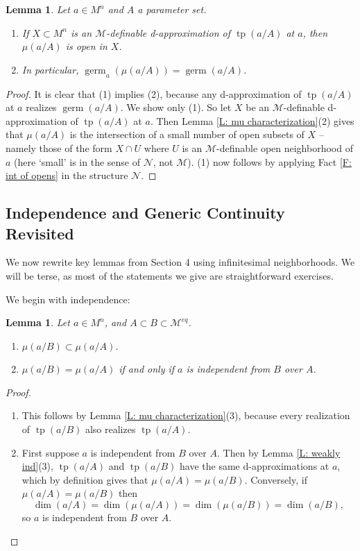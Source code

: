 \documentclass{amsart}
\newtheorem{lemma}[theorem]{Lemma}
\theoremstyle{definition}
\newcommand{\tp}{\operatorname{tp}}
\begin{document}
    \begin{lemma}\label{L: mu open}
        Let $a\in M^n$ and $A$ a parameter set. 
        \begin{enumerate}
            \item If $X\subset M^n$ is an $\mathcal M$-definable d-approximation of $\tp(a/A)$ at $a$, then $\mu(a/A)$ is open in $X$.
            \item In particular, $\operatorname{germ}_a(\mu(a/A))=\operatorname{germ}(a/A)$.
            \end{enumerate}
    \end{lemma}
    \begin{proof} It is clear that (1) implies (2), because any d-approximation of $\tp(a/A)$ at $a$ realizes $\operatorname{germ}(a/A)$. We show only (1). So let $X$ be an $\mathcal M$-definable d-approximation of $\tp(a/A)$ at $a$. Then Lemma \ref{L: mu characterization}(2) gives that $\mu(a/A)$ is the intersection of a small number of open subsets of $X$ -- namely those of the form $X\cap U$ where $U$ is an $\mathcal M$-definable open neighborhood of $a$ (here `small' is in the sense of $\mathcal N$, not $\mathcal M$). (1) now follows by applying Fact \ref{F: int of opens} in the structure $\mathcal N$.
    \end{proof}

        \subsection{Independence and Generic Continuity Revisited}

    We now rewrite key lemmas from Section 4 using infinitesimal neighborhoods. We will be terse, as most of the statements we give are straightforward exercises.

    We begin with independence:

    \begin{lemma}\label{L: germ fiber equality}
        Let $a\in M^n$, and $A\subset B\subset\mathcal M^{eq}$.
        \begin{enumerate}
            \item $\mu(a/B)\subset\mu(a/A)$.
            \item $\mu(a/B)=\mu(a/A)$ if and only if $a$ is independent from $B$ over $A$.
        \end{enumerate}
    \end{lemma}

    \begin{proof}
        \begin{enumerate}
            \item This follows by Lemma \ref{L: mu characterization}(3), because every realization of $\tp(a/B)$ also realizes $\tp(a/A)$.
            \item First suppose $a$ is independent from $B$ over $A$. Then by Lemma \ref{L: weakly ind}(3), $\tp(a/A)$ and $\tp(a/B)$ have the same d-approximations at $a$, which by definition gives that $\mu(a/A)=\mu(a/B)$. Conversely, if $\mu(a/A)=\mu(a/B)$ then $$\dim(a/A)=\dim(\mu(a/A))=\dim(\mu(a/B))=\dim(a/B),$$ so $a$ is independent from $B$ over $A$.
        \end{enumerate}
    \end{proof}
\end{document}

